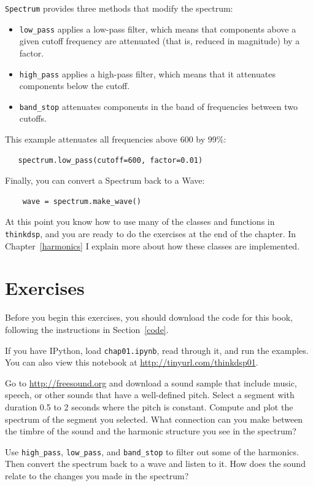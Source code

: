 \documentclass[12pt]{book}
\begin{document}
{\tt Spectrum} provides three methods that modify the spectrum:

\begin{itemize}

\item \verb"low_pass" applies a low-pass filter, which means that
  components above a given cutoff frequency are attenuated (that is,
  reduced in magnitude) by a factor.

\item \verb"high_pass" applies a high-pass filter, which means that
  it attenuates components below the cutoff.

\item \verb"band_stop" attenuates components in the band of
frequencies between two cutoffs.

\end{itemize}

This example attenuates all frequencies above 600 by 99\%:

\begin{verbatim}
   spectrum.low_pass(cutoff=600, factor=0.01)
\end{verbatim}

Finally, you can convert a Spectrum back to a Wave:

\begin{verbatim}
    wave = spectrum.make_wave()
\end{verbatim}

At this point you know how to use many of the classes and functions in
{\tt thinkdsp}, and you are ready to do the exercises at the end of
the chapter.  In Chapter~\ref{harmonics} I explain more
about how these classes are implemented.



\section{Exercises}

Before you begin this exercises, you should download the code
for this book, following the instructions in Section~\ref{code}.

\begin{exercise}
If you have IPython, load {\tt chap01.ipynb}, read through it, and run
the examples.  You can also view this notebook at
\url{http://tinyurl.com/thinkdsp01}.

Go to \url{http://freesound.org} and download a sound sample that
include music, speech, or other sounds that have a well-defined pitch.
Select a segment with duration 0.5 to 2 seconds where the pitch is
constant.  Compute and plot the spectrum of the segment you selected.
What connection can you make between the timbre of the sound and the
harmonic structure you see in the spectrum?

Use \verb"high_pass", \verb"low_pass", and \verb"band_stop" to
filter out some of the harmonics.  Then convert the spectrum back
to a wave and listen to it.  How does the sound relate to the
changes you made in the spectrum?
\end{exercise}
\end{document}
